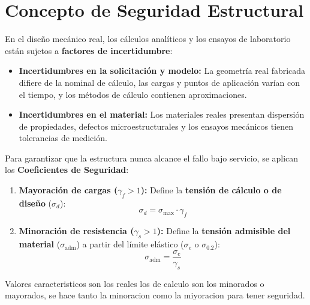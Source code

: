 \section{Concepto de Seguridad Estructural}

En el diseño mecánico real, los cálculos analíticos y los ensayos de laboratorio están sujetos a \textbf{factores de incertidumbre}:
\begin{itemize}
    \item \textbf{Incertidumbres en la solicitación y modelo:} La geometría real fabricada difiere de la nominal de cálculo, las cargas y puntos de aplicación varían con el tiempo, y los métodos de cálculo contienen aproximaciones.
    \item \textbf{Incertidumbres en el material:} Los materiales reales presentan dispersión de propiedades, defectos microestructurales y los ensayos mecánicos tienen tolerancias de medición.
\end{itemize}

Para garantizar que la estructura nunca alcance el fallo bajo servicio, se aplican los \textbf{Coeficientes de Seguridad}:
\begin{enumerate}
    \item \textbf{Mayoración de cargas ($\gamma_f > 1$):} Define la \textbf{tensión de cálculo o de diseño} ($\sigma_d$):
          \begin{equation}
              \sigma_d = \sigma_{\text{max}} \cdot \gamma_f
          \end{equation}
    \item \textbf{Minoración de resistencia ($\gamma_s > 1$):} Define la \textbf{tensión admisible del material} ($\sigma_{\text{adm}}$) a partir del límite elástico ($\sigma_e$ o $\sigma_{0.2}$):
          \begin{equation}
              \sigma_{\text{adm}} = \frac{\sigma_e}{\gamma_s}
          \end{equation}
\end{enumerate}

Valores caracteristicos son los reales los de calculo son los minorados o mayorados, se hace tanto la minoracion como la miyoracion para tener seguridad.
